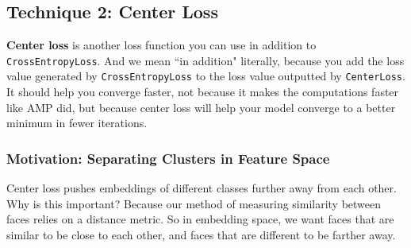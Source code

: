 \documentclass{article}
\newcommand{\ttt}[1]{\texttt{#1}}
\begin{document}





\newpage{}

\subsection{Technique 2: Center Loss}

\textbf{Center loss} is another loss function you can use in addition to \ttt{CrossEntropyLoss}. And we mean ``in addition" literally, because you add the loss value generated by \ttt{CrossEntropyLoss} to the loss value outputted by \ttt{CenterLoss}. \\

It should help you converge faster, not because it makes the computations faster like AMP did, but because center loss will help your model converge to a better minimum in fewer iterations.

\subsubsection{Motivation: Separating Clusters in Feature Space}

Center loss pushes embeddings of different classes further away from each other. \\

Why is this important? Because our method of measuring similarity between faces relies on a distance metric. So in embedding space, we want faces that are similar to be close to each other, and faces that are different to be farther away. \\
\end{document}
